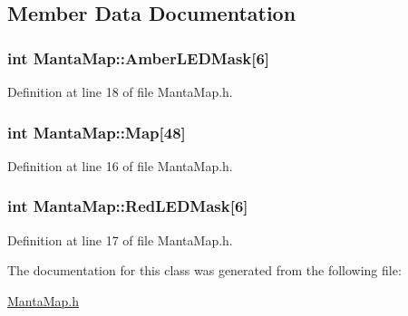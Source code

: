 \subsection{\-Member \-Data \-Documentation}
\hypertarget{classMantaMap_a615872f874e1733857dac0eaa0b50813}{
\subsubsection[{\-Amber\-L\-E\-D\-Mask}]{\setlength{\rightskip}{0pt plus 5cm}int {\bf \-Manta\-Map\-::\-Amber\-L\-E\-D\-Mask}\mbox{[}6\mbox{]}}}\label{classMantaMap_a615872f874e1733857dac0eaa0b50813}


\-Definition at line 18 of file \-Manta\-Map.\-h.

\hypertarget{classMantaMap_ac184760b514333563e14f7e63e684891}{
\subsubsection[{\-Map}]{\setlength{\rightskip}{0pt plus 5cm}int {\bf \-Manta\-Map\-::\-Map}\mbox{[}48\mbox{]}}}\label{classMantaMap_ac184760b514333563e14f7e63e684891}


\-Definition at line 16 of file \-Manta\-Map.\-h.

\hypertarget{classMantaMap_ad782964640f690a7d8770ecae14a1a54}{
\subsubsection[{\-Red\-L\-E\-D\-Mask}]{\setlength{\rightskip}{0pt plus 5cm}int {\bf \-Manta\-Map\-::\-Red\-L\-E\-D\-Mask}\mbox{[}6\mbox{]}}}\label{classMantaMap_ad782964640f690a7d8770ecae14a1a54}


\-Definition at line 17 of file \-Manta\-Map.\-h.



\-The documentation for this class was generated from the following file\-:\begin{DoxyCompactItemize}
\item 
\hyperlink{MantaMap_8h}{\-Manta\-Map.\-h}\end{DoxyCompactItemize}
